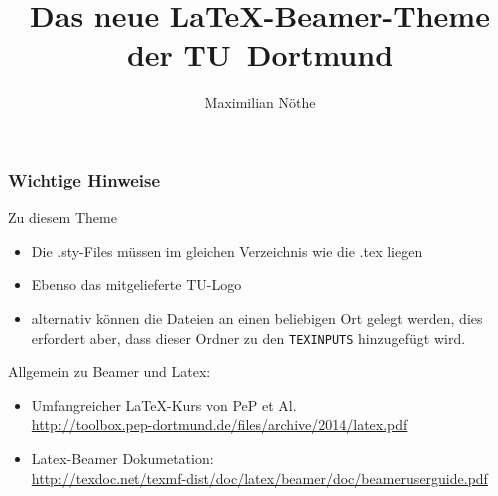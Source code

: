 \documentclass[9pt]{beamer}
\title{Das neue \LaTeX-Beamer-Theme der TU~Dortmund}
\author{Maximilian Nöthe}
\institute{Names des Lehrstuhls \\  Name der Fakultät}
\begin{document}
\begin{frame}
  \setcounter{framenumber}{0}
  \titlepage
\end{frame}

\begin{frame}
  \frametitle{Wichtige Hinweise}
  Zu diesem Theme
  \begin{itemize}
    \item Die .sty-Files müssen im gleichen Verzeichnis wie die .tex liegen
    \item Ebenso das mitgelieferte TU-Logo
    \item alternativ können die Dateien an einen beliebigen Ort gelegt werden,
    dies erfordert aber, dass dieser Ordner zu den \texttt{TEXINPUTS} hinzugefügt wird.
  \end{itemize}
  Allgemein zu Beamer und Latex:
  \begin{itemize}
    \item Umfangreicher \LaTeX-Kurs von PeP et Al. \\
    \url{http://toolbox.pep-dortmund.de/files/archive/2014/latex.pdf}
    \item Latex-Beamer Dokumetation:\\
    \url{http://texdoc.net/texmf-dist/doc/latex/beamer/doc/beameruserguide.pdf}
  \end{itemize}
\end{frame}




\end{document}
